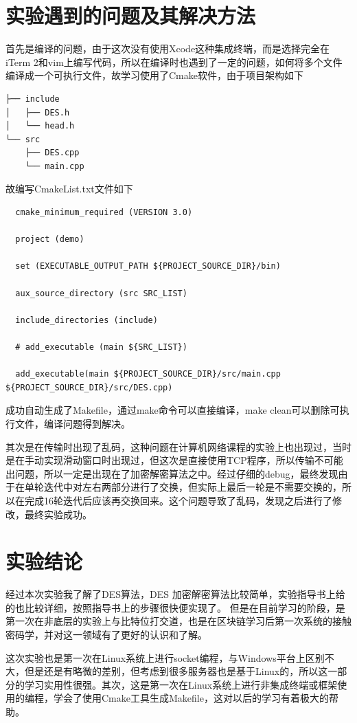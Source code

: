 \documentclass[UTF8,a4paper,10pt]{ctexart}
\begin{document}
\section{实验遇到的问题及其解决方法}
首先是编译的问题，由于这次没有使用Xcode这种集成终端，而是选择完全在iTerm 2和vim上编写代码，所以在编译时也遇到了一定的问题，如何将多个文件编译成一个可执行文件，故学习使用了Cmake软件，由于项目架构如下
\begin{lstlisting}
├── include
│   ├── DES.h
│   └── head.h
└── src
    ├── DES.cpp
    └── main.cpp
\end{lstlisting}
故编写CmakeList.txt文件如下
\begin{lstlisting}
  cmake_minimum_required (VERSION 3.0)

  project (demo)
  
  set (EXECUTABLE_OUTPUT_PATH ${PROJECT_SOURCE_DIR}/bin)
  
  aux_source_directory (src SRC_LIST)
  
  include_directories (include)
  
  # add_executable (main ${SRC_LIST})
  
  add_executable(main ${PROJECT_SOURCE_DIR}/src/main.cpp ${PROJECT_SOURCE_DIR}/src/DES.cpp)  
\end{lstlisting}
成功自动生成了Makefile，通过make命令可以直接编译，make clean可以删除可执行文件，编译问题得到解决。

\par 其次是在传输时出现了乱码，这种问题在计算机网络课程的实验上也出现过，当时是在手动实现滑动窗口时出现过，但这次是直接使用TCP程序，所以传输不可能出问题，所以一定是出现在了加密解密算法之中。经过仔细的debug，最终发现由于在单轮迭代中对左右两部分进行了交换，但实际上最后一轮是不需要交换的，所以在完成16轮迭代后应该再交换回来。这个问题导致了乱码，发现之后进行了修改，最终实验成功。


\section{实验结论}

经过本次实验我了解了DES算法，DES 加密解密算法比较简单，实验指导书上给的也比较详细，按照指导书上的步骤很快便实现了。 但是在目前学习的阶段，是第一次在非底层的实验上与比特位打交道，也是在区块链学习后第一次系统的接触密码学，并对这一领域有了更好的认识和了解。

\par 这次实验也是第一次在Linux系统上进行socket编程，与Windows平台上区别不大，但是还是有略微的差别，但考虑到很多服务器也是基于Linux的，所以这一部分的学习实用性很强。其次，这是第一次在Linux系统上进行非集成终端或框架使用的编程，学会了使用Cmake工具生成Makefile，这对以后的学习有着极大的帮助。
\end{document}
